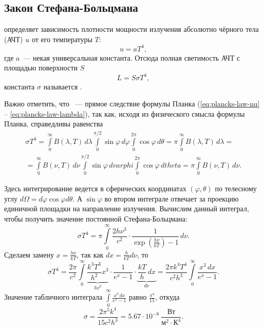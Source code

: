 \subsection{Закон Стефана-Больцмана}
 определяет зависимость плотности мощности излучения абсолютно чёрного тела (АЧТ) $u$ от его температуры $T$:
\begin{equation}
	u = a T^4,
\end{equation}
где $a$~--- некая универсальная константа.
Отсюда полная светимость АЧТ с площадью поверхности $S$
\begin{equation}
	L = S \sigma T^4,
	\label{eq:steff-bol-law}
\end{equation}
константа $\sigma$ называется .

Важно отметить, что ~--- прямое следствие формулы Планка (\ref{eq:plancks-law-nu} -- \ref{eq:plancks-law-lambda}), так как, исходя из физического смысла формулы Планка, справедливы равенства
\begin{multline}
	\sigma T^4 = \int\limits^\infty_0 B(\lambda, T) \,d \lambda \int\limits_0^{\pi/2} \sin \varphi \,d \varphi \int\limits_0^{2\pi} \cos \varphi \,d \theta = \pi \int\limits^\infty_0 B(\lambda, T) \,d \lambda =\\
	= \int\limits^\infty_0 B(\nu, T) \,d \nu \int\limits_0^{\pi/2} \sin \varphi \,d varphi \int\limits_0^{2\pi} \cos \varphi \,d theta = \pi \int\limits^\infty_0 B(\nu, T) \,d \nu.
\end{multline}

Здесь интегрирование ведется в сферических координатах $(\varphi, \theta)$ по телесному углу $d\Omega = d\varphi \cos \varphi d\theta$. А $\sin \varphi$ во втором интеграле отвечает за проекцию единичной площадки на направление излучения. Вычислим данный интеграл, чтобы получить значение постоянной Стефана-Больцмана:
\begin{equation*}
	\sigma T^4 = \pi \int\limits_0^{\infty} \frac{2h\nu^3}{c^2}\cdot \frac{1}{\exp\left(\frac{h\nu}{kT}\right)-1} \,d \nu.
\end{equation*}
Сделаем замену $x = \frac{h \nu}{k T}$, так как $dx = \frac{h}{k T} d\nu$, то
\begin{equation*}
	\sigma T^4 = \frac{2\pi}{c^2}  \int\limits_0^{\infty} \underbrace{\frac{k^3 T^3}{h^2} x^3}_{h\nu^3} \cdot \frac{1}{e^x - 1} \cdot \underbrace{\frac{kT}{h} \,d x}_{d\nu} = \frac{2 \pi k^4 T^4}{c^2 h^3} \int\limits_0^{\infty} \frac{x^3 \,d x}{e^x - 1}.
\end{equation*}
Значение табличного интеграла $\int\limits_0^{\infty} \frac{x^3 \,d x}{e^x - 1}$ равно $\frac{\pi^4}{15}$, откуда
\begin{equation*}
	\sigma = \frac{2 \pi^5 k^4}{15 c^2 h^3} = 5.67 \cdot 10^{-8}~\frac{\text{Вт}}{\text{м}^2 \cdot \text{К}^4}.
\end{equation*}

